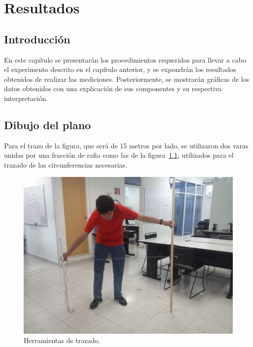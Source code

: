 
\chapter{Resultados} %

\label{Chap:Res} %

\section{Introducción}

En este capítulo se presentarán los procedimientos requeridos para llevar a cabo el experimento descrito en el capítulo anterior, y se expondrán los resultados obtenidos de realizar las mediciones. Posteriormente, se mostrarán gráficas de los datos obtenidos con una explicación de sus componentes y su respectiva interpretación. \\

\section{Dibujo del plano}

Para el trazo de la figura, que será de 15 metros por lado, se utilizaron dos varas unidas por una fracción de rafia como las de la figura~\ref{fig:HerTraz}, utilizados para el trazado de las circunferencias necesarias.\\

\begin{figure}[H]
\centering
\includegraphics[scale=0.08]{Figures/Herr}
\caption[Herramientas de trazado.]{Herramientas de trazado.}
\label{fig:HerTraz}
\end{figure}

